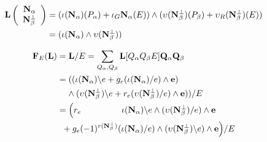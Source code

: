 \documentclass{beamer}
\newcommand{\ext}[1]{\ensuremath{\mathbf{#1}}}
\newcommand{\Is}{\ensuremath{\iota}}
\newcommand{\Vs}{\ensuremath{\upsilon}}
\begin{document}
\begin{frame}

\[
\begin{split}
  \ext{L}\left( \begin{array}{c} \eNal\\ \eNbePe \end{array} \right)
   & = (\Is(\eNal)(P_\alpha) + \Is_G\eNal(E))\wedge(\Vs(\eNbePe)(P_\beta) + \Vs_R(\eNbePe)(E)) \\
  &  = (\Is(\eNal)\wedge\Vs(\eNbePe))
\end{split}
\]

\[
\begin{split}
  \ext{F}_E(\ext{L})& = \ext{L}/E = \sum_{Q_\alpha,Q_\beta}\ext{L}[Q_\alpha Q_\beta E]\ext{Q}_\alpha\ext{Q}_\beta \\
  & =   ((\Is(\eNal)\backslash   e + g_e(\Is(\eNal)/e)\wedge\ext{e})                   \\
  & \;\;\;\;  \wedge  (\Vs(\eNbePe)\backslash e + r_e(\Vs(\eNbePe)/e)\wedge \ext{e}) ) / E \\
  & = \Big( r_e  \;\;\; \;\;\;\;\;\;\;\;\;\;\;\;\;\; \Is(\ext{\eNal})\backslash e\wedge (\Vs(\eNbePe)/e)      \wedge  \ext{e} \\
  & \;\;+ g_e (-1)^{r(\eNbePe)}(\Is(\eNal)/e)\wedge(\Vs(\eNbePe)\backslash e)    \wedge  \ext{e}\Big) / E 
  \end{split}
\]
 

\end{frame}
\end{document}
